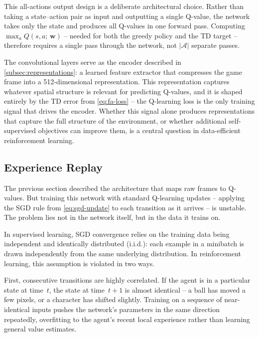


\smallskip
This all-actions output design is a deliberate architectural choice.
Rather than taking a state--action pair as input and outputting a
single Q-value, the network takes only the state and produces all
Q-values in one forward pass. Computing
$\max_a Q(s, a;\, \mathbf{w})$ -- needed for both the greedy policy
and the TD target -- therefore requires a single pass through the
network, not $|\mathcal{A}|$ separate passes.

\smallskip
The convolutional layers serve as the encoder described in
\cref{subsec:representations}: a learned feature extractor that
compresses the game frame into a 512-dimensional representation.
This representation captures whatever spatial structure is relevant
for predicting Q-values, and it is shaped entirely by the TD error
from \cref{eq:fa-loss} -- the Q-learning loss is the only training
signal that drives the encoder. Whether this signal alone
produces representations that capture the full structure of the
environment, or whether additional self-supervised objectives can
improve them, is a central question in data-efficient reinforcement
learning.

\subsection{Experience Replay}
\label{subsec:experience-replay-bg}

The previous section described the architecture that maps raw frames
to Q-values. But training this network with standard Q-learning
updates -- applying the SGD rule from \cref{eq:sgd-update} to each
transition as it arrives -- is unstable. The problem lies not in the
network itself, but in the data it trains on.

\smallskip
In supervised learning, SGD convergence relies on the training data
being independent and identically distributed (i.i.d.): each example
in a minibatch is drawn independently from the same underlying
distribution. In reinforcement learning, this assumption is violated
in two ways.

\smallskip
First, consecutive transitions are highly correlated. If the agent
is in a particular state at time~$t$, the state at time~$t+1$ is
almost identical -- a ball has moved a few pixels, or a character has
shifted slightly. Training on a sequence of near-identical inputs
pushes the network's parameters in the same direction repeatedly,
overfitting to the agent's recent local experience rather than
learning general value estimates.

